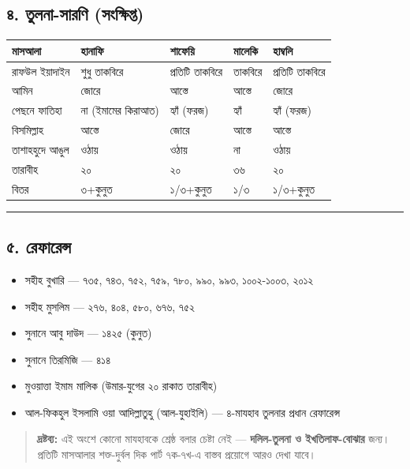 \subsection*{৪. তুলনা-সারণি (সংক্ষিপ্ত)}

\begin{table}[h]\centering\small
\begin{tabular}{lllll}
মাসআলা & হানাফি & শাফেয়ি & মালেকি & হাম্বলি \\
\hline
রাফউল ইয়াদাইন & শুধু তাকবিরে & প্রতিটি তাকবিরে & তাকবিরে & প্রতিটি তাকবিরে \\
আমিন & জোরে & আস্তে & আস্তে & জোরে \\
পেছনে ফাতিহা & না (ইমামের কিরাআত) & হ্যাঁ (ফরজ) & হ্যাঁ & হ্যাঁ (ফরজ) \\
বিসমিল্লাহ & আস্তে & জোরে & আস্তে & আস্তে \\
তাশাহহুদে আঙুল & ওঠায় & ওঠায় & না & ওঠায় \\
তারাবীহ & ২০ & ২০ & ৩৬ & ২০ \\
বিতর & ৩+কুনুত & ১/৩+কুনুত & ১/৩ & ১/৩+কুনুত \\
\hline
\end{tabular}
\end{table}

\medskip\hrule\medskip

\subsection*{৫. রেফারেন্স}

\begin{itemize}
\item সহীহ বুখারি — ৭৩৫, ৭৪৩, ৭৫২, ৭৫৯, ৭৮০, ৯৯০, ৯৯৩, ১০০২-১০০৩, ২০১২
\item সহীহ মুসলিম — ২৭৬, ৪০৪, ৫৮০, ৬৭৬, ৭৫২
\item সুনানে আবু দাউদ — ১৪২৫ (কুনুত)
\item সুনানে তিরমিজি — ৪১৪
\item মুওয়াত্তা ইমাম মালিক (উমার-যুগের ২০ রাকাত তারাবীহ)
\item আল-ফিকহুল ইসলামি ওয়া আদিল্লাতুহু (আল-যুহাইলি) — ৪-মাযহাব তুলনার প্রধান রেফারেন্স
\end{itemize}
\begin{quote}
\textbf{দ্রষ্টব্য:} এই অংশে কোনো মাযহাবকে শ্রেষ্ঠ বলার চেষ্টা নেই — \textbf{দলিল-তুলনা ও ইখতিলাফ-বোঝার} জন্য। প্রতিটি মাসআলার শক্ত-দুর্বল দিক পার্ট ৭ক-৭খ-এ বাস্তব প্রয়োগে আরও দেখা যাবে।
\end{quote}


